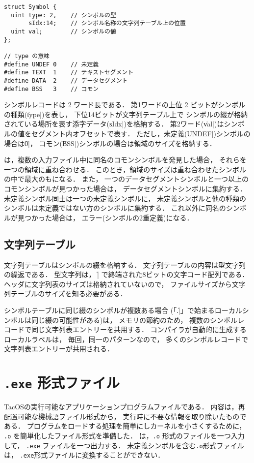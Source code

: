 \begin{lstlisting}[numbers=none,float=htb]
struct Symbol {
  uint type: 2,    // シンボルの型
       sIdx:14;    // シンボル名称の文字列テーブル上の位置
  uint val;        // シンボルの値
};

// type の意味
#define UNDEF 0    // 未定義
#define TEXT  1    // テキストセグメント
#define DATA  2    // データセグメント
#define BSS   3    // コモン
\end{lstlisting}

シンボルレコードは 2 ワード長である．
第1ワードの上位 2 ビットがシンボルの種類(\|type|)を表し，
下位14ビットが文字列テーブル上で
シンボルの綴が格納されている場所を表す添字データ(\|sIdx|)を格納する．
第2ワード(\|val|)はシンボルの値をセグメント内オフセットで表す．
ただし，未定義(\|UNDEF|)シンボルの場合は\|0|，
コモン(\|BSS|)シンボルの場合は領域のサイズを格納する．

{\ld}は，複数の入力ファイル中に同名のコモンシンボルを発見した場合，
それらを一つの領域に重ね合わせる．
このとき，領域のサイズは重ね合わせたシンボルの中で最大のもになる．
また，
一つのデータセグメントシンボルと一つ以上のコモンシンボルが見つかった場合は，
データセグメントシンボルに集約する．
未定義シンボル同士は一つの未定義シンボルに，
未定義シンボルと他の種類のシンボルは未定義ではない方のシンボルに集約する．
これ以外に同名のシンボルが見つかった場合は，
エラー(シンボルの2重定義)になる．

\subsection{文字列テーブル}
文字列テーブルはシンボルの綴を格納する．
文字列テーブルの内容は{\cmml}型文字列の繰返である．
{\cmml}型文字列は， \|\0| で終端された8ビットの文字コード配列である．
ヘッダに文字列表のサイズは格納されていないので，
ファイルサイズから文字列テーブルのサイズを知る必要がある．

シンボルテーブルに同じ綴のシンボルが複数ある場合
(「\|.|」で始まるローカルシンボルは同じ綴の可能性がある)は，
メモリの節約のため，
複数のシンボルレコードで同じ文字列表エントリーを共用する．
{\cmm}コンパイラが自動的に生成するローカルラベルは，
毎回，同一のパターンなので，
多くのシンボルレコードで文字列表エントリーが共用される．

\section{\texttt{.exe} 形式ファイル}
TacOSの実行可能なアプリケーションプログラムファイルである．
内容は，再配置可能な機械語ファイル形式から，
実行時に不要な情報を取り除いたものである．
プログラムをロードする処理を簡単にしカーネルを小さくするために，
\texttt{.o} を簡単化したファイル形式を準備した．
{\objexe}は，\texttt{.o} 形式のファイルを一つ入力して，
\texttt{.exe} ファイルを一つ出力する．
未定義シンボルを含む\texttt{.o}形式ファイルは，
\texttt{.exe}形式ファイルに変換することができない．

